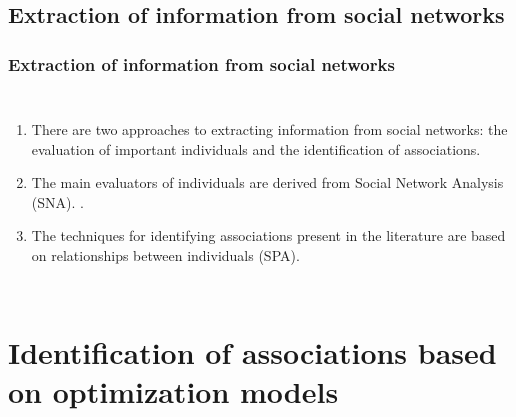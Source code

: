 \documentclass[aspectratio=169]{beamer}
\begin{document}
\subsection{Extraction of information from social networks}
\begin{frame}
\frametitle{Extraction of information from social networks}
  \begin{columns}
    \begin{enumerate}
      \item There are two approaches to extracting information from social networks: the evaluation of important individuals and the identification of associations.
      \item The main evaluators of individuals are derived from Social Network Analysis (SNA). \cite{Mci99}.
      \item The techniques for identifying associations present in the literature are based on relationships between individuals (SPA).
    \end{enumerate}
  \end{columns}
\end{frame}

\section{Identification of associations based on optimization models}
\end{document}
